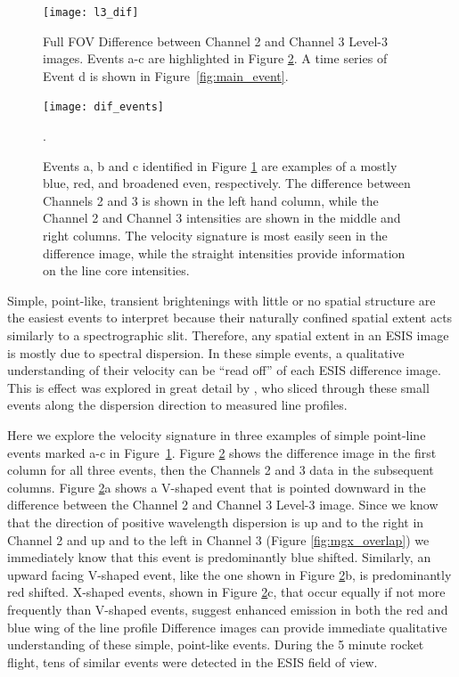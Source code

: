    		\begin{figure}[htb!]
   			\centering
   			\texttt{[image: l3\_dif]}
   			\caption{Full FOV Difference between Channel 2 and Channel 3 Level-3 images.  Events a-c are highlighted in Figure \ref{fig:dif_events}.  A time series of Event d is shown in Figure~\ref{fig:main_event}.}
   			\label{fig:l3_dif}
   		\end{figure}
   	
 		\begin{figure}[htb!]
   			\centering
   			\texttt{[image: dif\_events]}
   			\caption{Events a, b and c identified in Figure \ref{fig:l3_dif} are examples of a mostly blue, red, and broadened even, respectively. The difference between Channels 2 and 3 is shown in the left hand column, while the Channel 2 and Channel 3 intensities are shown in the middle and right columns.  The velocity signature is most easily seen in the difference image, while the straight intensities provide information on the line core intensities. 
   			     
   			}
   			\label{fig:dif_events}. 
   		\end{figure}

    	Simple, point-like, transient brightenings with little or no spatial structure are the easiest events to interpret because their naturally confined spatial extent acts similarly to a spectrographic slit.
    	Therefore, any spatial extent in an ESIS image is mostly due to spectral dispersion. 
    	In these simple events, a qualitative understanding of their velocity can be ``read off'' of each ESIS difference image.
    	This is effect was explored in great detail by \citet{Rust2019}, who sliced through these small events along the dispersion direction to measured line profiles.
    	
    	Here we explore the velocity signature in three examples of simple point-line events marked a-c in Figure~\ref{fig:l3_dif}.  
    	Figure \ref{fig:dif_events} shows the difference image in the first column for all three events, then the Channels 2 and 3 data in the subsequent columns. 
    	Figure \ref{fig:dif_events}a shows a V-shaped event that is pointed downward in the difference between the Channel 2 and Channel 3 Level-3 image.
    	Since we know that the direction of positive wavelength dispersion is up and to the right in Channel 2 and up and to the left in Channel 3 (Figure \ref{fig:mgx_overlap}) we immediately know that this event is predominantly blue shifted.  
    	Similarly, an upward facing V-shaped event, like the one shown in Figure \ref{fig:dif_events}b, is predominantly red shifted.
    	X-shaped events, shown in Figure \ref{fig:dif_events}c, that occur equally if not more frequently than V-shaped events, suggest enhanced emission in both the red and blue wing of the line profile
    	Difference images can provide immediate qualitative understanding of these simple, point-like events.  
    	During the 5 minute rocket flight, tens of similar events were detected in the ESIS field of view.  
    	
